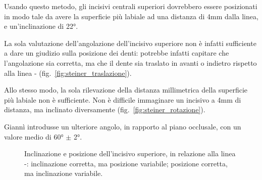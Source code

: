 Usando questo metodo, gli incisivi centrali superiori dovrebbero essere posizionati in modo tale da avere la superficie più labiale ad una distanza di 4mm dalla linea, e un'inclinazione di 22°.

La sola valutazione dell'angolazione dell'incisivo superiore non è infatti sufficiente a dare un giudizio sulla posizione dei denti: potrebbe infatti capitare che l'angolazione sia corretta, ma che il dente sia traslato in avanti o indietro rispetto alla linea - (fig.~\ref{fig:steiner_traslazione}).

Allo stesso modo, la sola rilevazione della distanza millimetrica della superficie più labiale non è sufficiente. Non è difficile immaginare un incisivo a 4mm di distanza, ma inclinato diversamente (fig.~\ref{fig:steiner_rotazione}).

Giannì introdusse un ulteriore angolo, in rapporto al piano occlusale, con un valore medio di 60° $\pm$ 2°.

\begin{figure}[!p]
 \quad
{}
 \centering
 \caption{Inclinazione e posizione dell'incisivo superiore, in relazione alla linea -:  inclinazione corretta, ma posizione variabile;  posizione corretta, ma inclinazione variabile.}
 \label{fig:steiner_incisivo_rototraslazione}
\end{figure}

